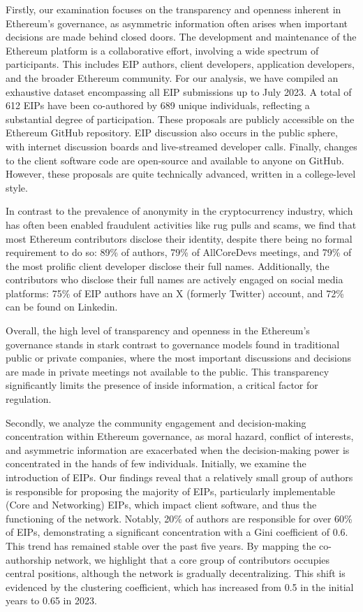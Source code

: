 \documentclass[No]{AEA}
\begin{document}
Firstly, our examination focuses on the transparency and openness inherent in Ethereum's governance, as asymmetric information often arises when important decisions are made behind closed doors. The development and maintenance of the Ethereum platform is a collaborative effort, involving a wide spectrum of participants. This includes EIP authors, client developers, application developers, and the broader Ethereum community. For our analysis, we have compiled an exhaustive dataset encompassing all EIP submissions up to July 2023. A total of 612 EIPs have been co-authored by 689  unique individuals, reflecting a substantial degree of participation. These proposals are publicly accessible on the Ethereum GitHub repository. EIP discussion also occurs in the public sphere, with internet discussion boards and live-streamed developer calls. Finally, changes to the client software code are open-source and available to anyone on GitHub. However, these proposals are quite technically advanced, written in a college-level style. 

In contrast to the prevalence of anonymity in the cryptocurrency industry, which has often been enabled fraudulent activities like rug pulls and scams, we find that most Ethereum contributors disclose their identity, despite there being no formal requirement to do so: 89\% of authors, 79\% of AllCoreDevs meetings, and 79\% of the most prolific client developer disclose their full names. Additionally, the contributors who disclose their full names are actively engaged on social media platforms: 75\% of EIP authors have an X (formerly Twitter) account, and 72\% can be found on Linkedin. 

Overall, the high level of transparency and openness in the Ethereum's governance stands in stark contrast to governance models found in traditional public or private companies, where the most important discussions and decisions are made in private meetings not available to the public. This transparency significantly limits the presence of inside information, a critical factor for regulation. 

Secondly, we analyze the community engagement and decision-making concentration within Ethereum governance, as moral hazard, conflict of interests, and asymmetric information are exacerbated when the decision-making power is concentrated in the hands of few individuals. Initially, we examine the introduction of EIPs. Our findings reveal that a relatively small group of authors is responsible for proposing the majority of EIPs, particularly implementable (Core and Networking) EIPs, which impact client software, and thus the functioning of the network. Notably, 20\% of authors are responsible for over 60\% of EIPs, demonstrating a significant concentration with a Gini coefficient of 0.6. This trend has remained stable over the past five years. By mapping the co-authorship network, we highlight that a core group of contributors occupies central positions, although the network is gradually decentralizing. This shift is evidenced by the clustering coefficient, which has increased from 0.5 in the initial years to 0.65 in 2023.
\end{document}
